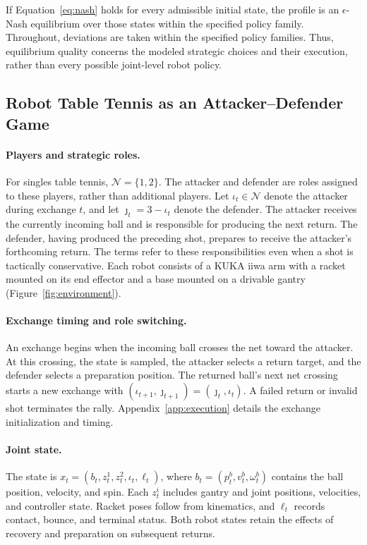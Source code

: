 \documentclass[pmlr]{jmlr}
\newcommand{\Players}{\mathcal{N}}
\begin{document}
If Equation~\eqref{eq:nash} holds for every admissible initial state, the profile is an $\epsilon$-Nash equilibrium over those states within the specified policy family. Throughout, deviations are taken within the specified policy families. Thus, equilibrium quality concerns the modeled strategic choices and their execution, rather than every possible joint-level robot policy.

\subsection{Robot Table Tennis as an Attacker--Defender Game}
\label{sec:game}

\paragraph{Players and strategic roles.}
For singles table tennis, $\Players=\{1,2\}$. The attacker and defender are roles assigned to these players, rather than additional players. Let $\iota_t\in\Players$ denote the attacker during exchange $t$, and let $\jmath_t=3-\iota_t$ denote the defender. The attacker receives the currently incoming ball and is responsible for producing the next return. The defender, having produced the preceding shot, prepares to receive the attacker's forthcoming return. The terms refer to these responsibilities even when a shot is tactically conservative. Each robot consists of a KUKA iiwa arm with a racket mounted on its end effector and a base mounted on a drivable gantry (Figure~\ref{fig:environment}).

\paragraph{Exchange timing and role switching.}
An exchange begins when the incoming ball crosses the net toward the attacker. At this crossing, the state is sampled, the attacker selects a return target, and the defender selects a preparation position. The returned ball's next net crossing starts a new exchange with $(\iota_{t+1},\jmath_{t+1})=(\jmath_t,\iota_t)$. A failed return or invalid shot terminates the rally. Appendix~\ref{app:execution} details the exchange initialization and timing.

\paragraph{Joint state.}
The state is $x_t=(b_t,z_t^1,z_t^2,\iota_t,\ell_t)$, where $b_t=(p_t^b,v_t^b,\omega_t^b)$ contains the ball position, velocity, and spin. Each $z_t^i$ includes gantry and joint positions, velocities, and controller state. Racket poses follow from kinematics, and $\ell_t$ records contact, bounce, and terminal status. Both robot states retain the effects of recovery and preparation on subsequent returns.
\end{document}
